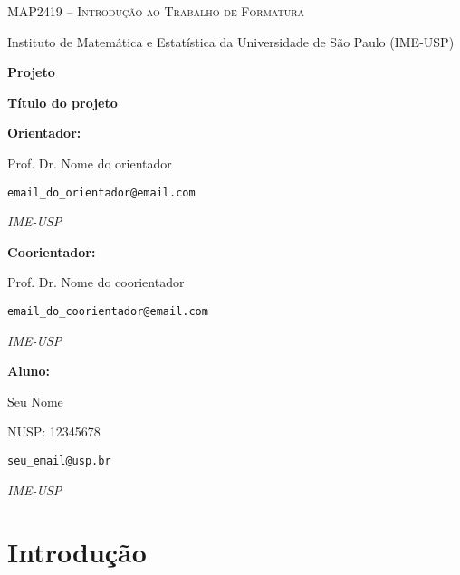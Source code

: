 \documentclass[12pt]{article}
\begin{document}
\begin{titlepage}
    \centering
    {\Large\scshape MAP2419 -- Introdução ao Trabalho de Formatura \par}
    \vspace{0.3cm}
    {\large Instituto de Matemática e Estatística da Universidade de São Paulo (IME-USP)\par}
    
    \vspace{3cm}
    
    {\LARGE\bfseries Projeto\par}
    \vspace{1cm}
    {\LARGE\bfseries Título do projeto\par}
    
    \vfill
    
    \begin{minipage}[t]{0.45\textwidth}
        \raggedright
        \textbf{Orientador:} \par
        Prof. Dr. Nome do orientador \par
        \texttt{email\_do\_orientador@email.com} \par
        \textit{IME-USP} \par\medskip
    
        \textbf{Coorientador:} \par
        Prof. Dr. Nome do coorientador \par
        \texttt{email\_do\_coorientador@email.com} \par
        \textit{IME-USP}
    \end{minipage}
    \hfill
    \begin{minipage}[t]{0.45\textwidth}
        \raggedright
        \textbf{Aluno:} \par
        Seu Nome \par
        NUSP: 12345678 \par
        \texttt{seu\_email@usp.br} \par
        \textit{IME-USP}
    \end{minipage}
    \vspace{2cm}
\end{titlepage}

\section*{Introdução}
\lipsum[1-2]
\end{document}
